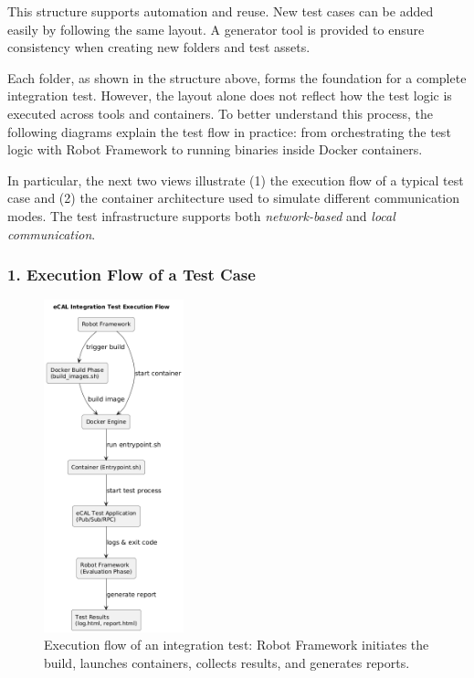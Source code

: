 This structure supports automation and reuse. New test cases can be added easily by following the same layout. A generator tool is provided to ensure consistency when creating new folders and test assets.


\vspace{1.5em}
Each folder, as shown in the structure above, forms the foundation for a complete integration test. However, the layout alone does not reflect how the test logic is executed across tools and containers. To better understand this process, the following diagrams explain the test flow in practice: from orchestrating the test logic with Robot Framework to running binaries inside Docker containers.

\vspace{1em}
In particular, the next two views illustrate (1) the execution flow of a typical test case and (2) the container architecture used to simulate different communication modes. The test infrastructure supports both \textit{network-based} and \textit{local communication}. 

\vspace{1em}
\subsubsection*{1. Execution Flow of a Test Case}

\begin{figure}[H]
	\centering
	\includegraphics[width=0.36\textwidth]{Images/test_execution_flow.png}
	\caption{Execution flow of an integration test: Robot Framework initiates the build, launches containers, collects results, and generates reports.}
	\label{fig:ecal_test_execution_flow}
\end{figure}

